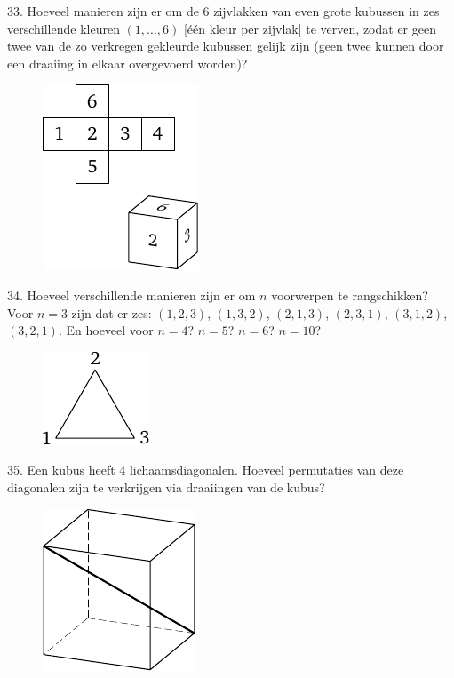 \begin{problem}{33.}
	Hoeveel manieren zijn er om de $6$ zijvlakken van even grote kubussen in zes verschillende kleuren $(1,\dotsc,6)$ [één kleur per zijvlak] te verven, zodat er geen twee van de zo verkregen gekleurde kubussen gelijk zijn (geen twee kunnen door een draaiing in elkaar overgevoerd worden)?
	\begin{figure}
		\includegraphics{resources/taskbook-17}
	\end{figure}
\end{problem}

\begin{problem}{34.}
	Hoeveel verschillende manieren zijn er om $n$ voorwerpen te rang\-schikken? Voor $n=3$ zijn dat er zes: $(1,2,3)$, $(1,3,2)$, $(2,1,3)$, $(2,3,1)$, $(3,1,2)$, $(3,2,1)$. En hoeveel voor $n=4$? $n=5$? $n=6$? $n=10$?
	\begin{figure}
		\includegraphics{resources/taskbook-18}
	\end{figure}
\end{problem}

\clearpage

\begin{problem}{35.}
	Een kubus heeft $4$ lichaamsdiagonalen. Hoeveel permutaties van deze diagonalen zijn te verkrijgen via draaiingen van de kubus?
	\begin{figure}
		\includegraphics{resources/taskbook-19}
	\end{figure}
\end{problem}

